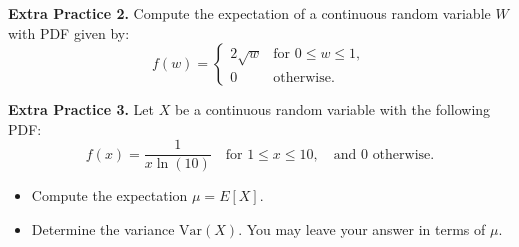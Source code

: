 \documentclass[10pt]{article}
\begin{document}
\newpage%

{\bf\color{blue}Extra Practice 2.}
Compute the expectation of a continuous random variable $W$ with PDF given by:
\[
f(w) = 
\begin{cases} 
2\sqrt{w} & \text{for } 0 \leq w \leq 1, \\
0 & \text{otherwise}.
\end{cases}
\]

\vfill

{\bf\color{blue}Extra Practice 3.} 
Let $X$ be a continuous random variable with the following PDF:
\[
f(x) = \frac{1}{x \ln(10)} \quad \text{for } 1 \leq x \leq 10, \quad \text{and } 0 \text{ otherwise}.
\]
\begin{itemize}
    \item[(a)] Compute the expectation $\mu=E[X]$.
        \vfill
    \item[(b)] Determine the variance $\text{Var}(X)$. You may leave your answer in terms of $\mu$.
        \vfill
        \vfill
\end{itemize}
\end{document}

